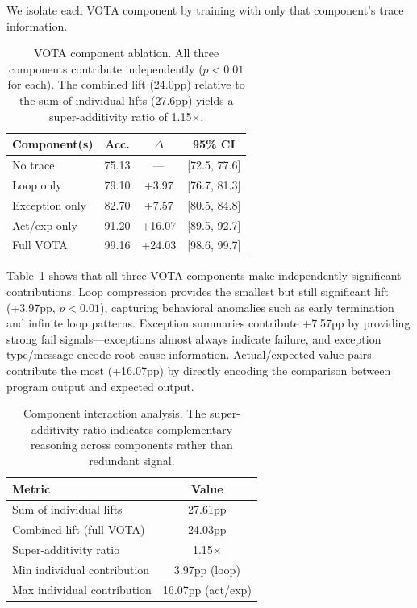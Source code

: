 \documentclass[11pt,a4paper]{article}
\begin{document}
We isolate each VOTA component by training with only that component's trace information.

\begin{table}[t]
\centering
\small
\begin{tabular}{lccc}
\toprule
\textbf{Component(s)} & \textbf{Acc.} & \textbf{$\Delta$} & \textbf{95\% CI} \\
\midrule
No trace & 75.13 & --- & [72.5, 77.6] \\
Loop only & 79.10 & +3.97 & [76.7, 81.3] \\
Exception only & 82.70 & +7.57 & [80.5, 84.8] \\
Act/exp only & 91.20 & +16.07 & [89.5, 92.7] \\
Full VOTA & 99.16 & +24.03 & [98.6, 99.7] \\
\bottomrule
\end{tabular}
\caption{VOTA component ablation. All three components contribute independently ($p < 0.01$ for each). The combined lift (24.0pp) relative to the sum of individual lifts (27.6pp) yields a super-additivity ratio of 1.15$\times$.}
\label{tab:component}
\end{table}

Table~\ref{tab:component} shows that all three VOTA components make independently significant contributions. Loop compression provides the smallest but still significant lift (+3.97pp, $p < 0.01$), capturing behavioral anomalies such as early termination and infinite loop patterns. Exception summaries contribute +7.57pp by providing strong fail signals---exceptions almost always indicate failure, and exception type/message encode root cause information. Actual/expected value pairs contribute the most (+16.07pp) by directly encoding the comparison between program output and expected output.

\begin{table}[t]
\centering
\small
\begin{tabular}{lc}
\toprule
\textbf{Metric} & \textbf{Value} \\
\midrule
Sum of individual lifts & 27.61pp \\
Combined lift (full VOTA) & 24.03pp \\
Super-additivity ratio & 1.15$\times$ \\
Min individual contribution & 3.97pp (loop) \\
Max individual contribution & 16.07pp (act/exp) \\
\bottomrule
\end{tabular}
\caption{Component interaction analysis. The super-additivity ratio indicates complementary reasoning across components rather than redundant signal.}
\label{tab:interaction}
\end{table}
\end{document}

